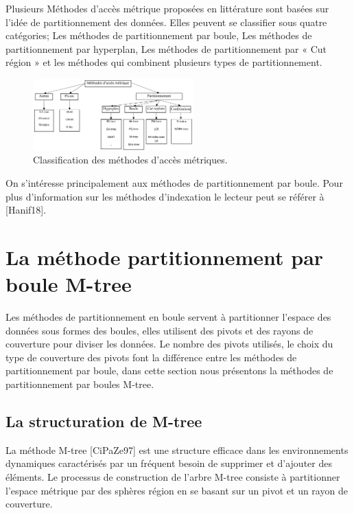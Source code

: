 Plusieurs Méthodes d’accès métrique proposées en littérature sont basées sur l’idée de partitionnement des données. Elles peuvent se classifier sous quatre catégories; Les méthodes de partitionnement par boule, Les méthodes de partitionnement par hyperplan, Les méthodes de partitionnement par « Cut région » et les méthodes qui combinent plusieurs types de partitionnement.
\begin{figure}[H]
	\centering
	\includegraphics[width=0.55\textwidth]{Figures/class.png} %
	\caption{ Classification des méthodes d’accès métriques.}
\end{figure}
On s'intéresse principalement aux méthodes de partitionnement par boule.
Pour plus d'information sur les méthodes d'indexation le lecteur peut se référer à [Hanif18].
\section{La méthode partitionnement par boule M-tree}
Les méthodes de partitionnement en boule servent à partitionner l'espace des données sous formes des boules, elles utilisent des pivots et des rayons de couverture pour diviser les données. Le nombre des pivots utilisés, le choix du type de couverture des pivots font la différence entre les méthodes de partitionnement par boule, dans cette section nous présentons la méthodes de partitionnement par boules M-tree.\\

\subsection{La structuration de M-tree}
La méthode M-tree [CiPaZe97] est une structure efficace dans les environnements dynamiques caractérisés par un fréquent besoin de supprimer et d'ajouter des éléments. Le processus de construction de l'arbre M-tree consiste à partitionner l'espace métrique par des sphères région en se basant sur un pivot et un rayon de couverture. \\

